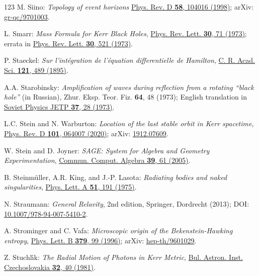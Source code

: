\begin{thebibliography}{123}
M. Siino: {\em Topology of event horizons}
\href{https://doi.org/10.1103/PhysRevD.58.104016}{Phys. Rev. D {\bf 58}, 104016 (1998)};
arXiv: \href{https://arxiv.org/abs/gr-qc/9701003}{gr-qc/9701003}.

L. Smarr: {\em Mass Formula for Kerr Black Holes},
\href{https://doi.org/10.1103/PhysRevLett.30.71}{Phys. Rev. Lett. {\bf 30}, 71 (1973)};
errata in \href{https://doi.org/10.1103/PhysRevLett.30.521}{Phys. Rev. Lett. {\bf 30}, 521 (1973)}.

P. Staeckel:
{\em Sur l'intégration de l'équation differentielle de Hamilton},
\href{https://gallica.bnf.fr/ark:/12148/bpt6k3077p/f489.item}{C. R. Acad. Sci. {\bf 121}, 489 (1895)}.

A.A. Starobinsky:
{\em Amplification of waves during reflection from a rotating ``black hole''} (in Russian),
Zhur. Eksp. Teor. Fiz. {\bf 64}, 48 (1973); English translation in
\href{http://jetp.ras.ru/cgi-bin/e/index/e/37/1/p28?a=list}{Soviet Physics JETP {\bf 37}, 28 (1973)}.

L.C. Stein and N. Warburton:
{\em Location of the last stable orbit in Kerr spacetime},
\href{https://doi.org/10.1103/PhysRevD.101.064007}{Phys. Rev. D  {\bf 101}, 064007 (2020)};
arXiv: \href{https://arxiv.org/abs/1912.07609}{1912.07609}.

W. Stein and D. Joyner:
{\em SAGE: System for Algebra and Geometry Experimentation},
\href{https://doi.org/10.1145/1101884.1101889}{Commun. Comput. Algebra {\bf 39}, 61 (2005)}.

B. Steinmüller, A.R. King, and J.-P. Lasota:
{\em Radiating bodies and naked singularities},
\href{https://doi.org/10.1016/0375-9601(75)90525-3}{Phys. Lett. A {\bf 51}, 191 (1975)}.

N. Straumann:
{\em General Relavity}, 2nd edition,
Springer, Dordrecht (2013);
DOI: \href{https://doi.org/10.1007/978-94-007-5410-2}{10.1007/978-94-007-5410-2}.

A. Strominger and C. Vafa:
{\em Microscopic origin of the Bekenstein-Hawking entropy},
\href{https://doi.org/10.1016/0370-2693(96)00345-0}{Phys. Lett. B {\bf 379}, 99 (1996)};
arXiv: \href{https://arxiv.org/abs/hep-th/9601029}{hep-th/9601029}.

Z. Stuchl\'{\i}k: {\em The Radial Motion of Photons in Kerr Metric},
\href{https://ui.adsabs.harvard.edu/abs/1981BAICz..32...40S}{Bul. Astron. Inst. Czechoslovakia {\bf 32}, 40 (1981)}.


\end{thebibliography}

